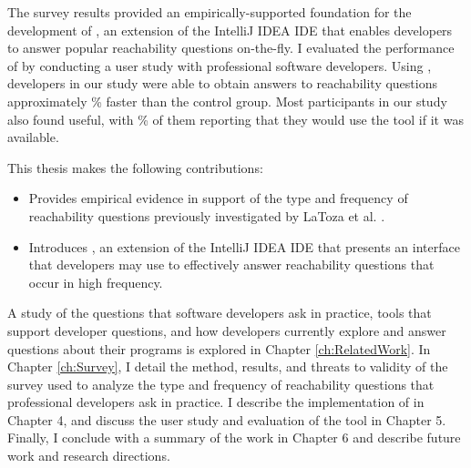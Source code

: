 \par The survey results provided an empirically-supported foundation for the
development of \emph{\toolname{}}, an extension of the IntelliJ IDEA IDE that
enables developers to answer popular reachability questions on-the-fly.
I evaluated the performance of \toolname{} by conducting a user study
with \userstudynum{} professional software developers.
Using \toolname{}, developers in our study were able to obtain answers to 
reachability questions approximately \fasterpct{}\% faster than the control 
group.
Most participants in our study also found \toolname{} useful, with 
\usefulpct{}\% of them reporting that they would use the tool if it was
available.

\par This thesis makes the following contributions:

\begin{itemize}
  \item Provides empirical evidence in support of the type and frequency of
        reachability questions previously investigated by LaToza et al.
        \cite{latoza-2010-reach}.
  \item Introduces \toolname, an extension of the IntelliJ IDEA IDE that 
        presents an interface that developers may use to effectively answer 
        reachability questions that occur in high frequency.
\end{itemize}

A study of the questions that software developers ask in practice, tools that
support developer questions, and how developers currently explore and 
answer questions about their programs is explored in Chapter 
\ref{ch:RelatedWork}. In Chapter \ref{ch:Survey}, I detail the method, 
results, and threats to validity of the survey used to analyze the type and 
frequency of reachability questions that professional developers ask in 
practice. I describe the implementation of \toolname{} in Chapter 4, and discuss
the user study and evaluation of the tool in Chapter 5.
Finally, I conclude with a summary of the work in Chapter 6 and describe future
work and research directions.


\endinput

